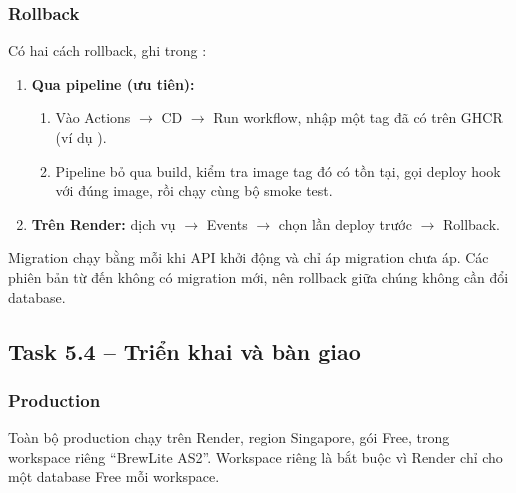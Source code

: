 \subsubsection{Rollback}
Có hai cách rollback, ghi trong :
\begin{enumerate}
\item \textbf{Qua pipeline (ưu tiên):}
  \begin{enumerate}
  \item Vào Actions $\rightarrow$ CD $\rightarrow$ Run workflow, nhập một tag đã có trên GHCR (ví dụ ).
  \item Pipeline bỏ qua build, kiểm tra image tag đó có tồn tại, gọi deploy hook với đúng image, rồi chạy cùng bộ smoke test.
  \end{enumerate}
\item \textbf{Trên Render:} dịch vụ $\rightarrow$ Events $\rightarrow$ chọn lần deploy trước $\rightarrow$ Rollback.
\end{enumerate}

Migration chạy bằng  mỗi khi API khởi động và chỉ áp migration chưa áp. Các phiên bản từ  đến  không có migration mới, nên rollback giữa chúng không cần đổi database.

\subsection{Task 5.4 -- Triển khai và bàn giao}\label{sec:production}

\subsubsection{Production}
Toàn bộ production chạy trên Render, region Singapore, gói Free, trong workspace riêng ``BrewLite AS2''. Workspace riêng là bắt buộc vì Render chỉ cho một database Free mỗi workspace.




